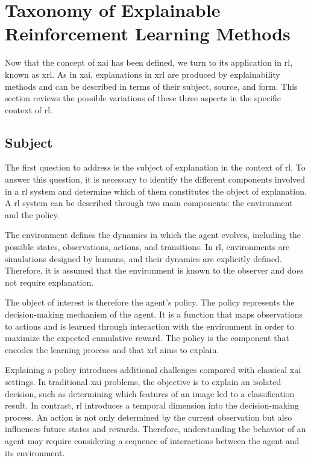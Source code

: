 \let\OriginalSectionMark\sectionmark
\renewcommand{\sectionmark}[1]{\OriginalSectionMark{Taxonomy of Explainability Methods}}
\section[Taxonomy of Explainable Reinforcement Learning Methods]{Taxonomy of Explainable\\Reinforcement Learning Methods}
\label{sec:explainability_in_reinforcement_learning_taxonomy_of_xrl_methods}
\let\sectionmark\OriginalSectionMark

Now that the concept of \gls{xai} has been defined, we turn to its application in \gls{rl}, known as \gls{xrl}.
As in \gls{xai}, explanations in \gls{xrl} are produced by explainability methods and can be described in terms of their subject, source, and form.
This section reviews the possible variations of these three aspects in the specific context of \gls{rl}.

\subsection{Subject}
\label{subsec:subject}

The first question to address is the subject of explanation in the context of \gls{rl}.
To answer this question, it is necessary to identify the different components involved in a \gls{rl} system and determine which of them constitutes the object of explanation.
A \gls{rl} system can be described through two main components: the environment and the policy.

The environment defines the dynamics in which the agent evolves, including the possible states, observations, actions, and transitions.
In \gls{rl}, environments are simulations designed by humans, and their dynamics are explicitly defined.
Therefore, it is assumed that the environment is known to the observer and does not require explanation.

The object of interest is therefore the agent's policy.
The policy represents the decision-making mechanism of the agent.
It is a function that maps observations to actions and is learned through interaction with the environment in order to maximize the expected cumulative reward.
The policy is the component that encodes the learning process and that \gls{xrl} aims to explain.

Explaining a policy introduces additional challenges compared with classical \gls{xai} settings.
In traditional \gls{xai} problems, the objective is to explain an isolated decision, such as determining which features of an image led to a classification result.
In contrast, \gls{rl} introduces a temporal dimension into the decision-making process.
An action is not only determined by the current observation but also influences future states and rewards.
Therefore, understanding the behavior of an agent may require considering a sequence of interactions between the agent and its environment.

